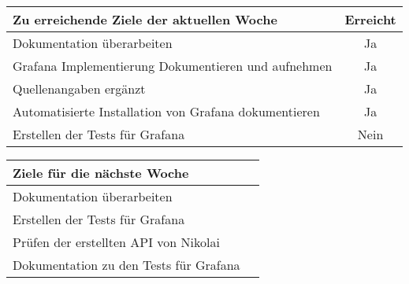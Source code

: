 \begin{tabularx}{\textwidth}{Xc}
    \arrayrulecolor{OliveGreen}
    \toprule
    {\bfseries Zu erreichende Ziele der aktuellen Woche} & {\bfseries Erreicht} \\
    \midrule[2pt]
    Dokumentation überarbeiten                              &Ja              \\
    \rowcolor{OliveGreen!15}
    Grafana Implementierung Dokumentieren und aufnehmen     &Ja              \\
    \rowcolor{White}
    Quellenangaben ergänzt                                  &Ja              \\
    \rowcolor{OliveGreen!15}
    Automatisierte Installation von Grafana dokumentieren   &Ja              \\
    \rowcolor{White}
    Erstellen der Tests für Grafana                         &Nein            \\
   \bottomrule[2pt]
\end{tabularx}
%
\vspace{1cm}
%
\begin{tabularx}{\textwidth}{Xc}
    \arrayrulecolor{OliveGreen}
    \toprule
    {\bfseries Ziele für die nächste Woche}        &                         \\
    \midrule[2pt]
    Dokumentation überarbeiten                     &                         \\
    \rowcolor{OliveGreen!15}
    Erstellen der Tests für Grafana               &                          \\
    \rowcolor{White}
    Prüfen der erstellten API von Nikolai         &                          \\
    \rowcolor{OliveGreen!15}
    Dokumentation zu den Tests für Grafana        &                          \\
\end{tabularx}

